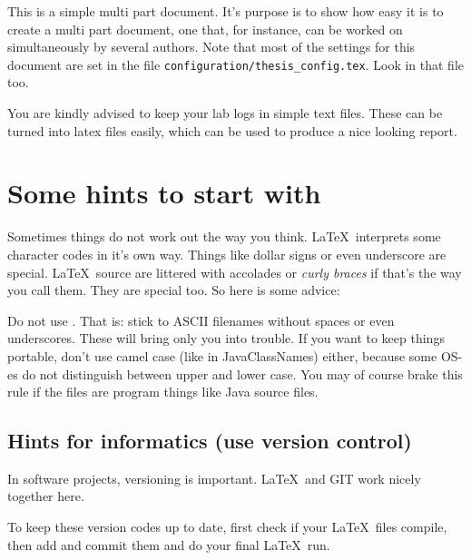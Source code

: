 This is a simple multi part document. It's purpose is to show how easy it is
to create a multi part document, one that, for instance, can be worked on 
simultaneously by several authors. Note that most of the settings for
this document are set in the file \texttt{configuration/thesis\_config.tex}. 
Look in that file too.

You are kindly advised to keep your lab logs in simple text
files. These can be turned into latex files easily,
which can be used to produce a nice looking report.
\section{Some hints to start with}
Sometimes things do not work out the way you think.
\LaTeX\ interprets some character codes in it's own way.
Things like dollar signs or even underscore are special.
\LaTeX\ source are littered with accolades or \textit{curly braces} if that's
the way you call them. They are special too. So here is some advice: 

Do not use . That is: stick to ASCII filenames without spaces or even underscores. 
These will bring only you into trouble. If you want to keep things portable, 
don't use camel case (like in JavaClassNames) either, because
some OS-es do not distinguish between upper and lower case. You may of
course brake this rule if the files are program things like
Java source files.

\subsection{Hints for informatics (use version control)}
In software projects, versioning is important. \LaTeX\ and \textsc{GIT}
work nicely together here.

To keep these version codes up to date, first check if your \LaTeX\  files compile,
then add and commit them and do your final \LaTeX\  run. 


